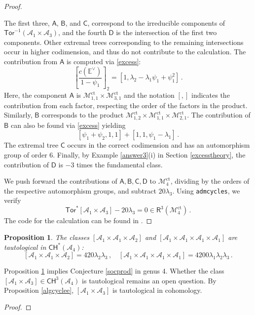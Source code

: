 \documentclass[11pt]{amsart}
\newtheorem{prop}[thm]{Proposition}
\theoremstyle{definition}
\newcommand{\M}{\mathcal{M}}
\newcommand{\A}{\mathcal{A}}
\newcommand{\CH}{\mathsf{CH}}
\DeclareMathOperator{\ct}{ct}
\newcommand{\Tor}{\mathsf{Tor}}
\begin{document}
{\begin{proof}
\begin{center}
\begin{tikzpicture}[scale=.35]
\end{tikzpicture}
\end{center} The first three, $\mathsf{A}$,
$\mathsf{B}$, and $\mathsf{C}$, correspond to the irreducible components of $\Tor^{-1}(\A_1\times \A_{3})$, and the fourth  $\mathsf{D}$ is the intersection of the first two components. Other extremal trees corresponding to the remaining intersections occur in higher codimension, and thus do not contribute to the calculation.  The contribution from $\mathsf{A}$ is computed via \eqref{excess}:
\[\left[ \frac{c(\mathbb{E}^{\vee})}{1-\psi_1}\right]_{2}=[1,\lambda_2-\lambda_1\psi_1+\psi_1^2]\,.
\]
Here, the component $\mathsf{A}$ is $\M_{1, 1}^{\ct}\times \M_{3, 1}^{\ct}$ and the notation $[, ]$ indicates the contribution from each factor, respecting the order of the factors in the product. 
Similarly, $\mathsf{B}$ corresponds to the product $\M_{1, 2}^{\ct}\times \M_{1, 1}^{\ct}\times \M_{2, 1}^{\ct}$. The contribution of $\mathsf B$ can also be found via \eqref{excess} yielding 
\[
[\psi_1+\psi_2,1,1]+[1,1, \psi_1-\lambda_1]\,.
\] The extremal tree $\mathsf{C}$ occurs in the correct codimension and has an automorphism group of order $6$. Finally, by Example \ref{answer3}(i) in Section \ref{excesstheory}, the contribution of $\mathsf{D}$ is $-3$ times the fundamental class.

We push forward the contributions of $\mathsf A, \mathsf B, \mathsf C, \mathsf D$ to $\M_{4}^{\ct}$, dividing by the orders of the respective automorphism groups, and subtract $20\lambda_3$. Using \texttt{admcycles}\cite{admcycles}, we verify 
$$\Tor^*[\A_1\times \A_3]-20\lambda_3=0 \in \mathsf{R}^3(\M_4^{\ct})\, .$$ The code for the calculation can be found in \cite {COP}. 
 \end{proof}


\begin{prop}\label{4tautological} The classes $[\A_1\times \A_1\times \A_2]$ and $[\A_1\times \A_1\times \A_1\times \A_1]$ are tautological in $\mathsf{CH}^*(\A_4)$: $$[\A_1\times \A_1\times \A_2]=420\lambda_2\lambda_3\, , \quad [\A_1\times \A_1\times \A_1\times \A_1]=4200\lambda_1\lambda_2\lambda_3\, .$$
\end{prop}


Proposition \ref{4tautological}
implies Conjecture \ref{socprod} in genus 4.
Whether the class $[\A_1\times \A_3]\in \CH^3(\A_4)$ is tautological remains an open question. By Proposition \ref{algcyclee}, 
$[\A_1\times \A_3]$ is tautological in cohomology. 
\begin{proof}
    

\end{proof}}
\end{document}

